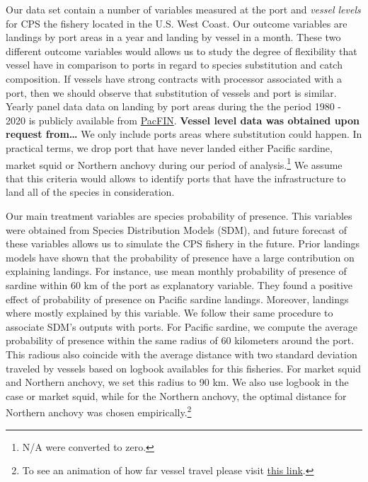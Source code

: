 Our data set contain a number of variables measured at the port and
\emph{vessel levels} for CPS the fishery located in the U.S. West Coast.
Our outcome variables are landings by port areas in a year and landing
by vessel in a month. These two different outcome variables would allows
us to study the degree of flexibility that vessel have in comparison to
ports in regard to species substitution and catch composition. If
vessels have strong contracts with processor associated with a port,
then we should observe that substitution of vessels and port is similar.
Yearly panel data data on landing by port areas during the the period
1980 - 2020 is publicly available from
\href{http://pacfin.psmfc.org/}{PacFIN}. \textbf{Vessel level data was
obtained upon request from\ldots{}} We only include ports areas where
substitution could happen. In practical terms, we drop port that have
never landed either Pacific sardine, market squid or Northern anchovy
during our period of analysis.\footnote{N/A were converted to zero.} We
assume that this criteria would allows to identify ports that have the
infrastructure to land all of the species in consideration.

Our main treatment variables are species probability of presence. This
variables were obtained from Species Distribution Models (SDM), and
future forecast of these variables allows us to simulate the CPS fishery
in the future. Prior landings models have shown that the probability of
presence have a large contribution on explaining landings. For instance,
\citet{smith2021potential} use mean monthly probability of presence of
sardine within 60 km of the port as explanatory variable. They found a
positive effect of probability of presence on Pacific sardine landings.
Moreover, landings where mostly explained by this variable. We follow
their same procedure to associate SDM's outputs with ports. For Pacific
sardine, we compute the average probability of presence within the same
radius of 60 kilometers around the port. This radious also coincide with
the average distance with two standard deviation traveled by vessels
based on logbook availables for this fisheries. For market squid and
Northern anchovy, we set this radius to 90 km. We also use logbook in
the case or market squid, while for the Northern anchovy, the optimal
distance for Northern anchovy was chosen empirically.\footnote{To see an
  animation of how far vessel travel please visit
  \href{https://drive.google.com/file/d/1-PE_lcZNcXNcyILA_6xhkHyEhV3mV2TA/view?usp=sharing}{this
  link}.}

